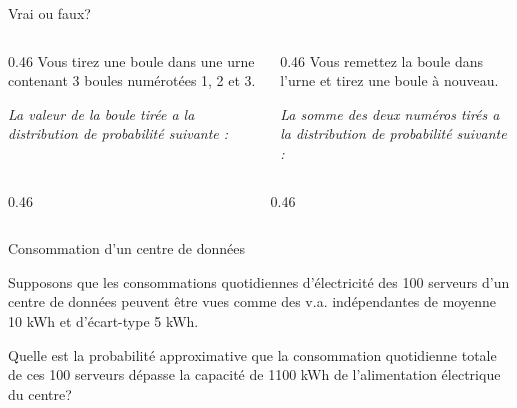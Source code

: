 \documentclass{BeamerTemplate}
\newcommand{\cibleReponse}{}
\newcommand{\lienreponse}[1]{\gdef\cibleReponse{#1}}
\begin{document}
\begin{frame}[t,label=quizurne]{Vrai ou faux?}

{\small
\begin{columns}[T]
\begin{column}{0.46\textwidth}
 Vous tirez une boule dans une urne contenant 3 boules numérotées 1, 2 et 3.

\smallskip
\textit{La valeur de la boule tirée a la distribution de probabilité suivante :}
\end{column}
\begin{column}{0.46\textwidth}
 Vous remettez la boule dans l'urne et tirez une boule à nouveau.

\smallskip
\textit{La somme des deux numéros tirés a la distribution de probabilité suivante :}
\end{column}
\end{columns}
}

\begin{columns}[T]
\begin{column}{0.46\textwidth}
\centering
{}
\end{column}
\begin{column}{0.46\textwidth}
\centering
{}
\end{column}
\end{columns}

\lienreponse{rep-ex3}
\end{frame}


\begin{frame}[t,label=excentre]{Consommation d'un centre de données}

{\small
Supposons que les consommations quotidiennes d'électricité des 100 serveurs d'un centre de données
peuvent être vues comme des v.a. indépendantes de moyenne 10 kWh et d'écart-type 5 kWh.

Quelle est la probabilité approximative que la consommation quotidienne totale de ces 100 serveurs
dépasse la capacité de 1100 kWh de l'alimentation électrique du centre?}

\vspace{3.2cm}

\lienreponse{rep-ex3}
\end{frame}
\end{document}
